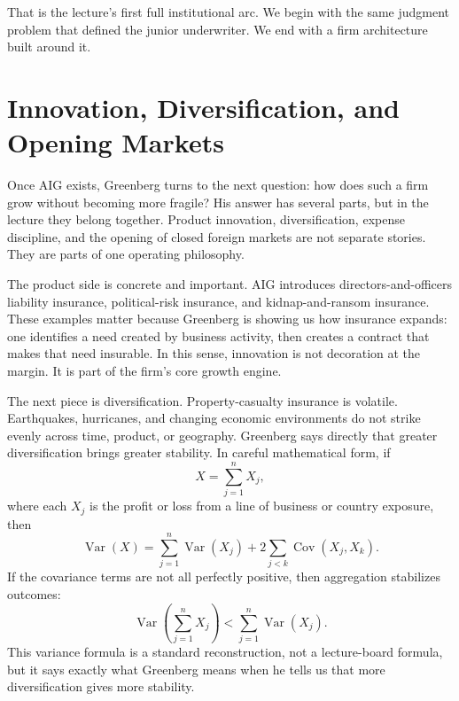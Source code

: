 That is the lecture's first full institutional arc. We begin with the same judgment problem that defined the junior underwriter. We end with a firm architecture built around it.

\section{Innovation, Diversification, and Opening Markets}

Once AIG exists, Greenberg turns to the next question: how does such a firm grow without becoming more fragile? His answer has several parts, but in the lecture they belong together. Product innovation, diversification, expense discipline, and the opening of closed foreign markets are not separate stories. They are parts of one operating philosophy.

The product side is concrete and important. AIG introduces directors-and-officers liability insurance, political-risk insurance, and kidnap-and-ransom insurance. These examples matter because Greenberg is showing us how insurance expands: one identifies a need created by business activity, then creates a contract that makes that need insurable. In this sense, innovation is not decoration at the margin. It is part of the firm's core growth engine.

The next piece is diversification. Property-casualty insurance is volatile. Earthquakes, hurricanes, and changing economic environments do not strike evenly across time, product, or geography. Greenberg says directly that greater diversification brings greater stability. In careful mathematical form, if
\begin{equation}
X = \sum_{j=1}^{n} X_j,
\end{equation}
where each \(X_j\) is the profit or loss from a line of business or country exposure, then
\begin{equation}
\operatorname{Var}(X)
=
\sum_{j=1}^{n}\operatorname{Var}(X_j)
+
2\sum_{j<k}\operatorname{Cov}(X_j,X_k).
\end{equation}
If the covariance terms are not all perfectly positive, then aggregation stabilizes outcomes:
\begin{equation}
\operatorname{Var}\!\left(\sum_{j=1}^{n} X_j\right)
<
\sum_{j=1}^{n}\operatorname{Var}(X_j).
\end{equation}
This variance formula is a standard reconstruction, not a lecture-board formula, but it says exactly what Greenberg means when he tells us that more diversification gives more stability.

